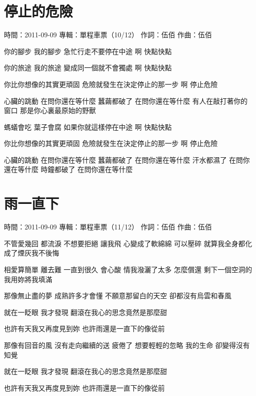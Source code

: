 \documentclass[UTF8,a4paper,oneside,twocolumn,12pt]{ctexbook}
\newcommand{\infopair}[2]{\textbullet #1：#2}
\newcommand{\zc}[1][伍佰]{\infopair{作詞}{#1}}
\newcommand{\zq}[1][伍佰]{\infopair{作曲}{#1}}
\newcommand{\zj}[1]{\infopair{專輯}{#1}}
\newcommand{\sj}[1]{\infopair{時間}{#1}}
\newenvironment{info}{\begin{flushleft}\kaishu
	}
	{\end{flushleft}\normalsize\yahei\par}
\newenvironment{lyric}{
	}
{}
\begin{document}
\section{停止的危險}
\begin{info}
	\sj{2011-09-09}
	\zj{單程車票（10/12）}
	\zc
	\zq
\end{info}
\begin{lyric}
	你的腳步 我的腳步
	急忙行走不要停在中途
	啊 快點快點

	你的旅途 我的旅途
	變成同一個就不會獨處
	啊 快點快點

	你比你想像的其實更頑固
	危險就發生在決定停止的那一步
	啊 停止危險

	心臟的跳動 在問你還在等什麼
	蠶繭都破了 在問你還在等什麼
	有人在敲打著你的窗口
	那是你心裏最原始的野獸

	螞蟻會吃 葉子會腐
	如果你就這樣停在中途
	啊 快點快點

	你比你想像的其實更頑固
	危險就發生在決定停止的那一步
	啊 停止危險

	心臟的跳動 在問你還在等什麼
	蠶繭都破了 在問你還在等什麼
	汗水都濕了 在問你還在等什麼
	時鐘都破了 在問你還在等什麼
\end{lyric}

\section{雨一直下}
\begin{info}
	\sj{2011-09-09}
	\zj{單程車票（11/12）}
	\zc
	\zq
\end{info}
\begin{lyric}
	不管愛幾回 都流淚
	不想要拒絕 讓我飛
	心變成了軟綿綿 可以壓碎
	就算我全身都化成了煙灰我不後悔

	相愛算簡單 離去難
	一直到很久 會心酸
	情我潑灑了太多 怎麼償還
	剩下一個空洞的我用妳將我填滿

	那像無止盡的夢
	成熟許多才會懂
	不願意那留白的天空
	卻都沒有烏雲和春風

	就在一眨眼 我才發現
	翻滾在我心的思念竟然是那麼甜

	也許有天我又再度見到妳
	也許雨還是一直下的像從前

	那像有回音的風
	沒有走向繼續的送
	疲倦了 想要輕輕的忽略
	我的生命 卻變得沒有知覺

	就在一眨眼 我才發現
	翻滾在我心的思念竟然是那麼甜

	也許有天我又再度見到妳
	也許雨還是一直下的像從前
\end{lyric}
\end{document}
